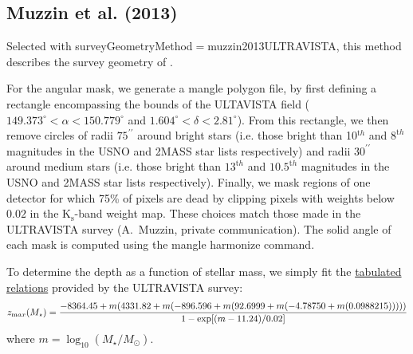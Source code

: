 \subsection{Muzzin et al. (2013)}\label{phys:surveyGeometry:surveyGeometryMuzzin2014ULTRAVISTA}

Selected with {\normalfont \ttfamily surveyGeometryMethod}$=${\normalfont \ttfamily muzzin2013ULTRAVISTA}, this method describes the survey geometry of \cite{muzzin_evolution_2013}. 

For the angular mask, we generate a \gls{mangle} polygon file, by first defining a rectangle encompassing the bounds of the ULTAVISTA field ($149.373^\circ < \alpha < 150.779^\circ$ and $1.604^\circ < \delta < 2.81^\circ$). From this rectangle, we then remove circles of radii $75^{\prime\prime}$ around bright stars (i.e. those bright than 10$^{\mathrm th}$ and $8^{\mathrm th}$ magnitudes in the USNO and 2MASS star lists respectively) and radii $30^{\prime\prime}$ around medium stars (i.e. those bright than $13^{\mathrm th}$ and $10.5^{\mathrm th}$ magnitudes in the USNO and 2MASS star lists respectively). Finally, we mask regions of one detector for which 75\% of pixels are dead by clipping pixels with weights below $0.02$ in the K$_{\mathrm s}$-band weight map. These choices match those made in the ULTRAVISTA survey (A.~Muzzin, private communication). The solid angle of each mask is computed using the \gls{mangle} {\normalfont \ttfamily harmonize} command.

To determine the depth as a function of stellar mass, we simply fit the \href{http://www.strw.leidenuniv.nl/galaxyevolution/ULTRAVISTA/Mstar_redshift_completeness_emp_uvista_v4.1_100.dat}{tabulated relations} provided by the ULTRAVISTA survey:
\begin{equation}
z_{\mathrm max}(M_\star) = {-8364.45 + m (4331.82 + m (-896.596 + m (92.6999 + m (-4.78750 + m (0.0988215))))) \over 1 - \exp[(m-11.24)/0.02] }
 \label{eq:MuzzinDepthPolynomial}
\end{equation}
where $m= \log_{10}(M_\star/M_\odot)$.

